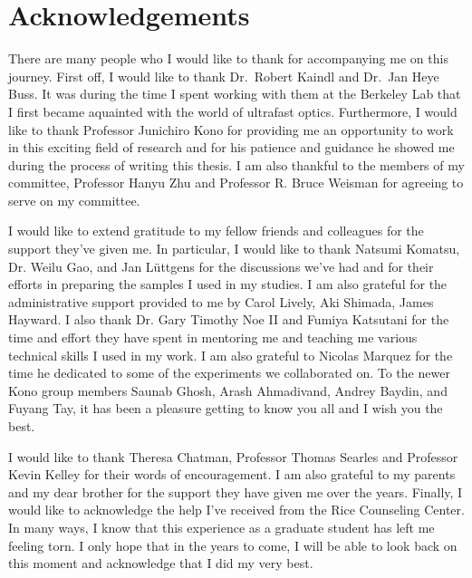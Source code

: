 \chapter*{Acknowledgements}

There are many people who I would like to thank for accompanying me on this journey. First off, I would like to thank Dr.\ Robert Kaindl and Dr.\ Jan Heye Buss. It was during the time I spent working with them at the Berkeley Lab that I first became aquainted with the world of ultrafast optics. Furthermore, I would like to thank Professor Junichiro Kono for providing me an opportunity to work in this exciting field of research and for his patience and guidance he showed me during the process of writing this thesis. I am also thankful to the members of my committee, Professor Hanyu Zhu and Professor R. Bruce Weisman for agreeing to serve on my committee.

I would like to extend gratitude to my fellow friends and colleagues for the support they've given me. In particular, I would like to thank Natsumi Komatsu, Dr. Weilu Gao, and Jan L{\"u}ttgens for the discussions we've had and for their efforts in preparing the samples I used in my studies. I am also grateful for the administrative support provided to me by Carol Lively, Aki Shimada, James Hayward. I also thank Dr. Gary Timothy Noe II and Fumiya Katsutani for the time and effort they have spent in mentoring me and teaching me various technical skills I used in my work. I am also grateful to Nicolas Marquez for the time he dedicated to some of the experiments we collaborated on. To the newer Kono group members Saunab Ghosh, Arash Ahmadivand, Andrey Baydin, and Fuyang Tay, it has been a pleasure getting to know you all and I wish you the best.

I would like to thank Theresa Chatman, Professor Thomas Searles and Professor Kevin Kelley for their words of encouragement. I am also grateful to my parents and my dear brother for the support they have given me over the years. Finally, I would like to acknowledge the help I've received from the Rice Counseling Center. In many ways, I know that this experience as a graduate student has left me feeling torn. I only hope that in the years to come, I will be able to look back on this moment and acknowledge that I did my very best.

